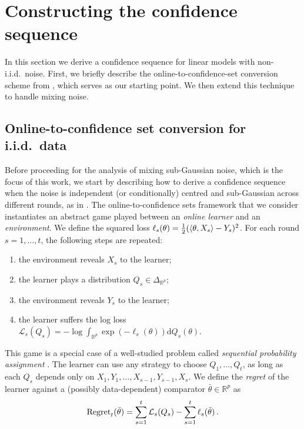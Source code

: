 \section{Constructing the confidence sequence}
\label{sec:conf_sets}

In this section we derive a confidence sequence for linear models with non-i.i.d.~noise. First, we briefly describe the online-to-confidence-set conversion scheme from \citet{clerico2025confidence}, which serves as our starting point. We then extend this technique to handle mixing noise.

\subsection{Online-to-confidence set conversion for i.i.d.~data}
\label{sec:conf_set_proof}
Before proceeding for the analysis of mixing sub-Gaussian noise, which is the focus of this work, we start by describing how to derive a confidence sequence when the noise is independent (or conditionally) centred and sub-Gaussian across different rounds, as in \cite{clerico2025confidence}. The online-to-confidence sets framework that we consider instantiates an abstract game played between an \emph{online learner} and an \emph{environment}. We define the squared loss $\ell_s(\theta) = \frac{1}{2}(\left\langle\theta,X_s\right\rangle - Y_s)^2$. For each round $s = 1, \dots, t$, the following steps are repeated:
\begin{enumerate}
\item the environment reveals $X_s$ to the learner;
\item the learner plays a distribution $Q_s \in \Delta_{\mathbb{R}^p}$;
\item the environment reveals $Y_s$ to the learner;
\item the learner suffers the log loss $\mathcal{L}_s(Q_s) = -\log\int_{\mathbb{R}^p}\exp(-\ell_s(\theta))\mathrm{d}Q_s(\theta)$.
\end{enumerate}

This game is a special case of a well-studied problem called \emph{sequential probability assignment} \citep{cesabianchi2006prediction}. The learner can use any strategy to choose $Q_1, \dots, Q_t$, as long as each $Q_s$ depends only on $X_1, Y_1, \dots, X_{s-1}, Y_{s-1}, X_s$. We define the \emph{regret} of the learner against a (possibly data-dependent) comparator $\bar{\theta} \in \mathbb{R}^p$ as
\begin{equation*}
\mathrm{Regret}_t(\bar{\theta}) = \sum_{s=1}^{t}\mathcal{L}_s(Q_s) - \sum_{s=1}^{t}\ell_s(\bar{\theta})\,.
\end{equation*}


